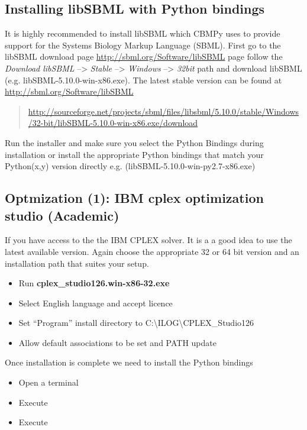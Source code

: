 \documentclass[a4paper,11pt,english]{sphinxmanual}
\begin{document}
\subsection{Installing libSBML with Python bindings}
\label{install_doc:installing-libsbml-with-python-bindings}
It is highly recommended to install libSBML which CBMPy uses to provide support
for the Systems Biology Markup Language (SBML). First go to the libSBML download
page \url{http://sbml.org/Software/libSBML} page follow the \emph{Download libSBML} --\textgreater{} \emph{Stable} --\textgreater{}
\emph{Windows} --\textgreater{} \emph{32bit} path and download libSBML (e.g. libSBML-5.10.0-win-x86.exe). The latest
stable version can be found at \url{http://sbml.org/Software/libSBML}
\begin{quote}

\url{http://sourceforge.net/projects/sbml/files/libsbml/5.10.0/stable/Windows/32-bit/libSBML-5.10.0-win-x86.exe/download}
\end{quote}

Run the installer and make sure you select the Python Bindings during installation
or install the appropriate Python bindings that match your Python(x,y) version directly e.g.
(libSBML-5.10.0-win-py2.7-x86.exe)


\subsection{Optmization (1): IBM cplex optimization studio (Academic)}
\label{install_doc:optmization-1-ibm-cplex-optimization-studio-academic}
If you have access to the the IBM CPLEX solver. It is a a good idea to use the latest available version.
Again choose the appropriate 32 or 64 bit version and an installation path that suites your setup.
\begin{itemize}
\item {} 
Run \textbf{cplex\_studio126.win-x86-32.exe}

\item {} 
Select English language and accept licence

\item {} 
Set ``Program'' install directory to C:\textbackslash{}ILOG\textbackslash{}CPLEX\_Studio126

\item {} 
Allow default associations to be set and PATH update

\end{itemize}

Once installation is complete we need to install the Python bindings
\begin{itemize}
\item {} 
Open a terminal

\item {} 
Execute 

\item {} 
Execute 

\end{itemize}
\end{document}
